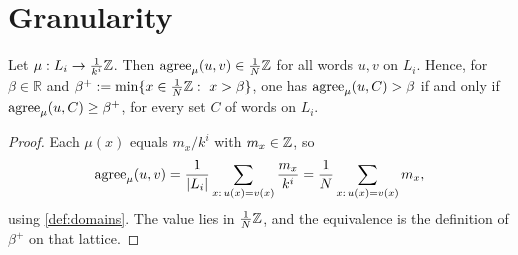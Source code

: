 \section{Granularity}

\begin{lemma}[Granularity]\label{lem:gran}
Let $\mu:L_i\to\frac1{k^i}\mathbb{Z}$. Then $\mathrm{agree}_\mu(u,v)\in\frac1N\mathbb{Z}$ for all words
$u,v$ on $L_i$. Hence, for $\beta\in\mathbb R$ and
$\beta^+:=\min\{x\in\frac1N\Z:\ x>\beta\}$, one has $\mathrm{agree}_\mu(u,C)>\beta$ if and only if
$\mathrm{agree}_\mu(u,C)\ge\beta^+$, for every set $C$ of words on $L_i$.
\end{lemma}

\begin{proof}
Each $\mu(x)$ equals $m_x/k^i$ with $m_x\in\mathbb{Z}$, so
\[
\mathrm{agree}_\mu(u,v)=\frac1{|L_i|}\sum_{x:\,u(x)=v(x)}\frac{m_x}{k^i}=\frac1N\sum_{x:\,u(x)=v(x)}m_x,
\]
using \cref{def:domains}. The value lies in $\frac1N\mathbb{Z}$, and the equivalence is the definition of
$\beta^+$ on that lattice.
\end{proof}
